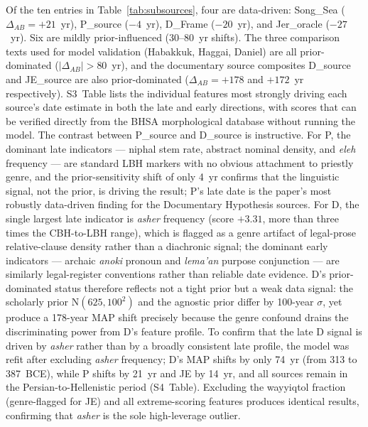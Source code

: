 \documentclass[10pt,letterpaper]{article}
\begin{document}
Of the ten entries in Table~\ref{tab:subsources}, four are
data-driven: Song\_Sea ($\Delta_{AB} = +21$~yr), P\_source ($-4$~yr),
D\_Frame ($-20$~yr), and Jer\_oracle ($-27$~yr).  Six are mildly
prior-influenced (30--80~yr shifts).  The three comparison texts used for
model validation (Habakkuk, Haggai, Daniel) are all prior-dominated
($|\Delta_{AB}| > 80$~yr), and the documentary source composites D\_source
and JE\_source are also prior-dominated ($\Delta_{AB} = +178$ and
$+172$~yr respectively).  S3~Table lists the individual features most
strongly driving each source's date estimate in both the late and early
directions, with scores that can be verified directly from the BHSA
morphological database without running the model.  The contrast between
P\_source and D\_source is instructive.  For P, the dominant late
indicators --- niphal stem rate, abstract nominal density, and
\textit{eleh} frequency --- are standard LBH markers with no obvious
attachment to priestly genre, and the prior-sensitivity shift of only
4~yr confirms that the linguistic signal, not the prior, is driving the
result; P's late date is the paper's most robustly data-driven finding
for the Documentary Hypothesis sources.  For D, the single largest late
indicator is \textit{asher} frequency (score $+3.31$, more than three
times the CBH-to-LBH range), which is flagged as a genre artifact of
legal-prose relative-clause density rather than a diachronic signal;
the dominant early indicators --- archaic \textit{anoki} pronoun and
\textit{lema'an} purpose conjunction --- are similarly legal-register
conventions rather than reliable date evidence.  D's prior-dominated
status therefore reflects not a tight prior but a weak data signal: the
scholarly prior N$(625, 100^2)$ and the agnostic prior differ by
100-year $\sigma$, yet produce a 178-year MAP shift precisely because
the genre confound drains the discriminating power from D's feature
profile.  To confirm that the late D signal is driven by \textit{asher} rather than by a
broadly consistent late profile, the model was refit after excluding \textit{asher}
frequency; D's MAP shifts by only 74~yr (from 313 to 387~BCE), while P shifts by 21~yr
and JE by 14~yr, and all sources remain in the Persian-to-Hellenistic period (S4~Table).
Excluding the wayyiqtol fraction (genre-flagged for JE) and all extreme-scoring features
produces identical results, confirming that \textit{asher} is the sole high-leverage outlier.
\end{document}
